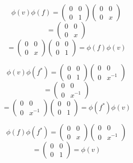 \begin{solution}
    $$\phi(v)\phi(f)=\left(\begin{array}{cc} 0 & 0 \\ 0 & 1 \end{array}\right)
    \left(\begin{array}{cc} 0 & 0 \\ 0 & x \end{array}\right)$$
    $$=\left(\begin{array}{cc} 0 & 0 \\ 0 & x \end{array}\right)$$
    $$=\left(\begin{array}{cc} 0 & 0 \\ 0 & x \end{array}\right)
    \left(\begin{array}{cc} 0 & 0 \\ 0 & 1 \end{array}\right)=\phi(f)\phi(v)$$

    $$\phi(v)\phi(f^*)=\left(\begin{array}{cc} 0 & 0 \\ 0 & 1 \end{array}\right)
    \left(\begin{array}{cc} 0 & 0 \\ 0 & x^{-1} \end{array}\right)$$
    $$=\left(\begin{array}{cc} 0 & 0 \\ 0 & x^{-1} \end{array}\right)$$
    $$=\left(\begin{array}{cc} 0 & 0 \\ 0 & x^{-1} \end{array}\right)
    \left(\begin{array}{cc} 0 & 0 \\ 0 & 1 \end{array}\right)=\phi(f^*)\phi(v)$$

    $$\phi(f)\phi(f^*)=\left(\begin{array}{cc} 0 & 0 \\ 0 & x \end{array}\right)
    \left(\begin{array}{cc} 0 & 0 \\ 0 & x^{-1} \end{array}\right)$$
    $$=\left(\begin{array}{cc} 0 & 0 \\ 0 & 1 \end{array}\right)=\phi(v)$$


\end{solution}
